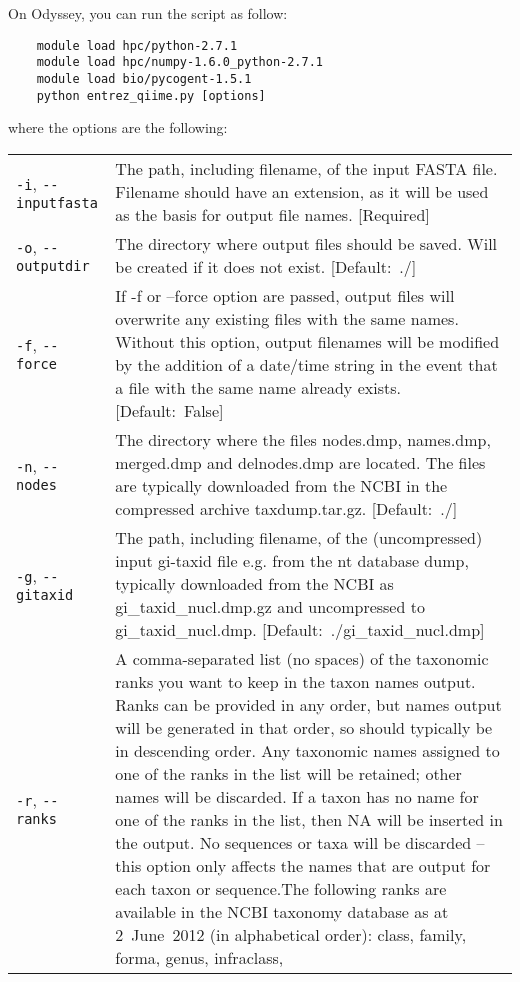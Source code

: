 \documentclass[11pt]{amsart}
\begin{document}
On Odyssey, you can run the script as follow:

\begin{verbatim}
    module load hpc/python-2.7.1    
    module load hpc/numpy-1.6.0_python-2.7.1
    module load bio/pycogent-1.5.1
    python entrez_qiime.py [options]
\end{verbatim}

where the options are the following:

\begin{longtable}{@{} p{1.4in} p{5.35in} @{}} %
      \verb|-i|, \verb|--inputfasta| & The path, including filename, of the input FASTA file. Filename should have an extension, as it will be used as the basis for output file names. \mbox{[Required]} \\
      \verb|-o|, \verb|--outputdir| & The directory where output files should be saved. Will be created if it does not exist. \mbox{[Default:~./]} \\
      \verb|-f|, \verb|--force| & If -f or --force option are passed, output files will overwrite any existing files with the same names. Without this option, output filenames will be modified by the addition of a date/time string in the event that a file with the same name already exists. \mbox{[Default:~False]} \\
      \verb|-n|, \verb|--nodes| & The directory where the files nodes.dmp, names.dmp, merged.dmp and delnodes.dmp are located. The files are typically downloaded from the NCBI in the compressed archive taxdump.tar.gz. \mbox{[Default: ./]} \\
      \verb|-g|, \verb|--gitaxid| & The path, including filename, of the (uncompressed) input gi-taxid file e.g. from the nt database dump, typically downloaded from the NCBI as gi\_taxid\_nucl.dmp.gz and uncompressed to gi\_taxid\_nucl.dmp. \mbox{[Default:~./gi\_taxid\_nucl.dmp]} \\
      \verb|-r|, \verb|--ranks|  & A comma-separated list (no spaces) of the taxonomic ranks you want to keep in the taxon names output. Ranks can be provided in any order, but names output will be generated in that order, so should typically be in descending order. Any taxonomic names assigned to one of the ranks in the list will be retained; other names will be discarded. If a taxon has no name for one of the ranks in the list, then NA will be inserted in the output. No sequences or taxa will be discarded -- this option only affects the names that are output for each taxon or sequence.The following ranks are available in the NCBI taxonomy database as at 2~June~2012 (in alphabetical order): class, family, forma, genus, \mbox{infraclass}, \linebreak
\end{longtable}
\end{document}
